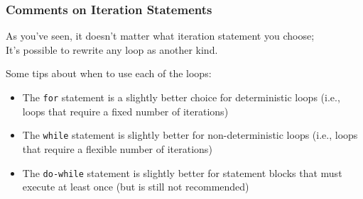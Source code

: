 \begin{frame}
\frametitle{Comments on Iteration Statements}

As you've seen, it doesn't matter what iteration statement you choose;\\
\quad It's possible to rewrite any loop as another kind.

Some tips about when to use each of the loops:

\begin{itemize}
	\item The \texttt{for} statement is a slightly better choice for deterministic loops (i.e., loops that require a fixed number of iterations)
	\item The \texttt{while} statement is slightly better for non-deterministic loops (i.e., loops that require a flexible number of iterations)
	\item The \texttt{do-while} statement is slightly better for statement blocks that must execute at least once (but is still not recommended)
\end{itemize}
\end{frame}






